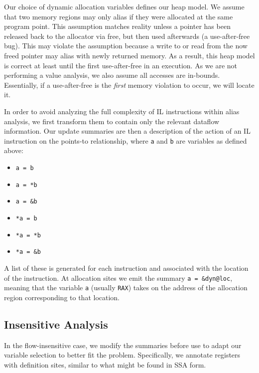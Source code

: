 Our choice of dynamic allocation variables defines our heap model.
We assume that two memory regions may only alias if they were allocated at the same program point.
This assumption matches reality unless a pointer has been released back to the allocator via free, but then used afterwards (a use-after-free bug).
This may violate the assumption because a write to or read from the now freed pointer may alias with newly returned memory.
As a result, this heap model is correct at least until the first use-after-free in an execution.
As we are not performing a value analysis, we also assume all accesses are in-bounds.
Essentially, if a use-after-free is the \emph{first} memory violation to occur, we will locate it.

In order to avoid analyzing the full complexity of IL instructions within alias analysis, we first transform them to contain only the relevant dataflow information.
Our update summaries are then a description of the action of an IL instruction on the points-to relationship, where \texttt{a} and \texttt{b} are variables as defined above:

\begin{itemize}
\item \texttt{a = b}
\item \texttt{a = *b}
\item \texttt{a = \&b}
\item \texttt{*a = b}
\item \texttt{*a = *b}
\item \texttt{*a = \&b}
\end{itemize}

A list of these is generated for each instruction and associated with
the location of the instruction.  At allocation sites we emit the
summary \texttt{a = \&dyn@loc}, meaning that the variable \texttt{a}
(usually \texttt{RAX}) takes on the address of the allocation region
corresponding to that location.  %

\subsection{Insensitive Analysis}
In the flow-insensitive case, we modify the summaries before use to adapt our variable selection to better fit the problem.
Specifically, we annotate registers with definition sites, similar to what might be found in SSA form.

